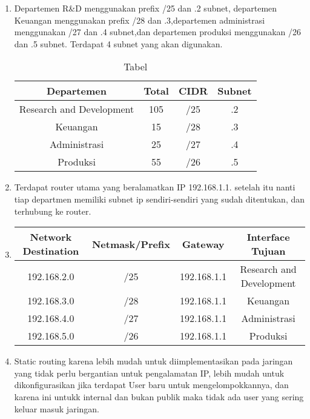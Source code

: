 \begin{enumerate}
    \item Departemen R&D menggunakan prefix /25 dan .2 subnet,
    departemen Keuangan menggunakan prefix /28 dan .3,departemen
    administrasi menggunakan /27 dan .4 subnet,dan departemen produksi menggunakan /26 dan .5 subnet. 
    Terdapat 4 subnet yang akan digunakan.
    \begin{table}[H]
        \centering
        \begin{tabular}{|c|c|c|c|}
        \hline
        \textbf{Departemen} & \textbf{Total} & \textbf{CIDR} & \textbf{Subnet}\\
        \hline
        Research and Development & 105 & /25  & .2\\
        Keuangan & 15 & /28 & .3 \\
        Administrasi & 25 & /27 & .4\\
        Produksi & 55 & /26 & .5 \\
        \hline
        \end{tabular}
        \caption{Tabel }
        \label{tab:routing}
        \end{table}
    \item Terdapat router utama yang beralamatkan IP 192.168.1.1.  setelah itu nanti tiap
    departmen memiliki subnet ip sendiri-sendiri yang sudah ditentukan, dan terhubung ke router.
    
    \item 
    \begin{center}
    \begin{tabular}{|c|c|c|c|}
    \hline
    \textbf{Network Destination} & \textbf{Netmask/Prefix} & \textbf{Gateway} & \textbf{Interface Tujuan} \\
    \hline
    192.168.2.0 & /25 & 192.168.1.1 & Research and Development \\
    192.168.3.0 & /28 & 192.168.1.1 & Keuangan \\
    192.168.4.0 & /27 & 192.168.1.1 & Administrasi \\
    192.168.5.0 & /26 & 192.168.1.1 & Produksi \\
    \hline
    \end{tabular}
    \label{tab:routing}
    \end{center}
    
    \item Static routing karena lebih mudah untuk diimplementasikan pada jaringan yang tidak perlu bergantian
    untuk pengalamatan IP, lebih mudah untuk dikonfigurasikan jika terdapat User baru untuk mengelompokkannya,
    dan karena ini untukk internal dan bukan publik maka tidak ada user yang sering keluar masuk jaringan.

\end{enumerate}


